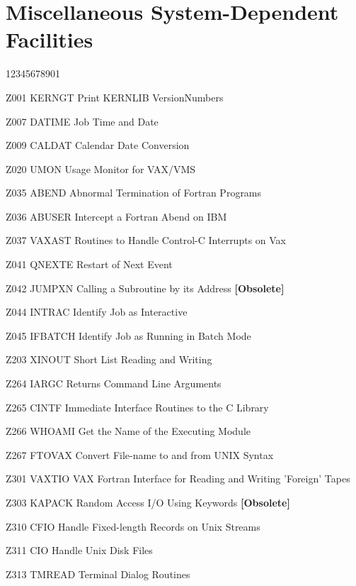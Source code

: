 \section*{Miscellaneous System-Dependent Facilities}
\begin{DLtt}{12345678901}
\item[Z001 KERNGT] Print KERNLIB VersionNumbers
\item[Z007 DATIME] Job Time and Date
\item[Z009 CALDAT] Calendar Date Conversion
\item[Z020 UMON] Usage Monitor for VAX/VMS
\item[Z035 ABEND] Abnormal Termination of Fortran Programs
\item[Z036 ABUSER] Intercept a Fortran Abend on IBM
\item[Z037 VAXAST] Routines to Handle Control-C Interrupts on Vax
\item[Z041 QNEXTE] Restart of Next Event
\item[Z042 JUMPXN] Calling a Subroutine by its Address {\bf [Obsolete]}
\item[Z044 INTRAC] Identify Job as Interactive
\item[Z045 IFBATCH] Identify Job as Running in Batch Mode
\item[Z203 XINOUT] Short List Reading and Writing
\item[Z264 IARGC] Returns Command Line Arguments
\item[Z265 CINTF] Immediate Interface Routines to the C Library
\item[Z266 WHOAMI] Get the Name of the Executing Module
\item[Z267 FTOVAX] Convert File-name to and from UNIX Syntax
\item[Z301 VAXTIO] VAX Fortran Interface for Reading and
Writing 'Foreign' Tapes
\item[Z303 KAPACK] Random Access I/O Using Keywords {\bf [Obsolete]}
\item[Z310 CFIO] Handle Fixed-length Records on Unix Streams
\item[Z311 CIO] Handle Unix Disk Files
\item[Z313 TMREAD] Terminal Dialog Routines
\end{DLtt}
